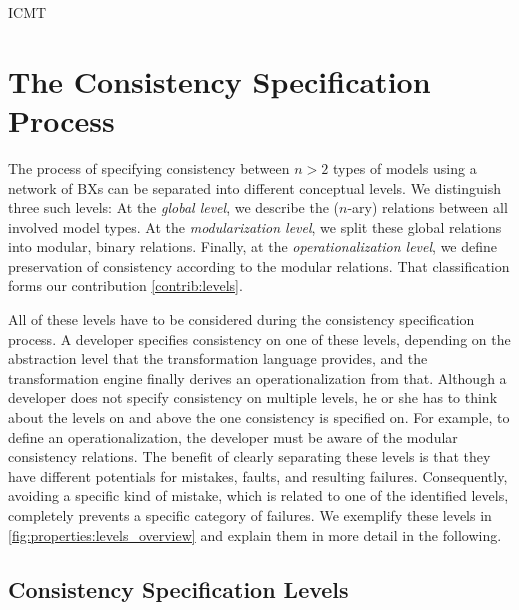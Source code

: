 \begin{copiedFrom}{ICMT}
\section{The Consistency Specification Process}

The process of specifying consistency between $n>2$ types of models using a network of \acp{BX} can be separated into different conceptual levels.
We distinguish three such levels:
At the \emph{global level}, we describe the ($n$-ary) relations between all involved model types.
At the \emph{modularization level}, we split these global relations into modular, binary relations.
Finally, at the \emph{operationalization level}, we define preservation of consistency %
according to the modular relations.
That classification forms our contribution \ref{contrib:levels}.

All of these levels have to be considered during the consistency specification process.
A developer specifies consistency on one of these levels, depending on the abstraction level that the transformation language provides, and the transformation engine finally derives an operationalization from that.
Although a developer does not specify consistency on multiple levels, he or she has to think about the levels on and above the one consistency is specified on.
For example, to define an operationalization, the developer must be aware of the modular consistency relations.
The benefit of clearly separating these levels is that they have different potentials for mistakes, faults, and resulting failures. 
Consequently, avoiding a specific kind of mistake, which is related to one of the identified levels, completely prevents a specific category of failures.
We exemplify these levels in \autoref{fig:properties:levels_overview} and explain them in more detail in the following.


\subsection{Consistency Specification Levels}
\label{chap:properties:levels}


\end{copiedFrom}
